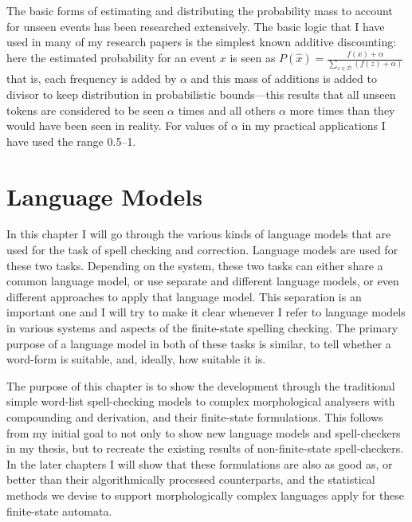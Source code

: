 \documentclass[officiallayout]{unihelcompling}
\begin{document}
The basic forms of estimating and distributing the probability mass to account
for unseen events has been researched extensively. The basic logic that I have
used in many of my research papers is the simplest known additive discounting:
here the estimated probability for an event $x$ is seen as $P(\hat{x}) =
\frac{f(x) + \alpha}{\sum_{z \in \mathcal{D}}(f(z) + \alpha)}$ that is, each
frequency is added by $\alpha$ and this mass of additions is added to divisor
to keep distribution in probabilistic bounds---this results that all unseen
tokens are considered to be seen $\alpha$ times and all others $\alpha$ more
times than they would have been seen in reality. For values of $\alpha$ in
my practical applications I have used the range 0.5--1.



\chapter{Language Models}
\label{chap:language-models}

In this chapter I will go through the various kinds of language models that are
used for the task of spell checking and correction. Language models are used
for these two tasks. Depending on the system, these two tasks can either share
a common language model, or use separate and different language models, or even
different approaches to apply that language model. This separation is an
important one and I will try to make it clear whenever I refer to language
models in various systems and aspects of the finite-state spelling checking.
The primary purpose of a language model in both of these tasks is similar, to
tell whether a word-form is suitable, and, ideally, how suitable it is.

The purpose of this chapter is to show the development through the traditional
simple word-list spell-checking models to complex morphological analysers with
compounding and derivation, and their finite-state formulations. This follows
from my initial goal to not only to show new language models and spell-checkers
in my thesis, but to recreate the existing results of non-finite-state
spell-checkers. In the later chapters I will show that these formulations are
also as good as, or better than their algorithmically processed counterparts,
and the statistical methods we devise to support morphologically complex
languages apply for these finite-state automata.
\end{document}
